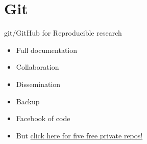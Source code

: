 \documentclass{beamer}
\begin{document}
\section{Git}
\begin{frame}{git/GitHub for Reproducible research}
\begin{itemize}
	\item<2->{Full documentation}
	\vspace{2ex}
	\item<3->{Collaboration}
	\vspace{2ex}
	\item<4->{Dissemination}
	\vspace{2ex}
	\item<5->{Backup}
	\vspace{2ex}
	\item<6->{Facebook of code}
	\vspace{2ex}
	\item<7->{But \href{https://education.github.com/discount_requests/new}{click here for five free private repos!}}

\end{itemize}
\end{frame}
\end{document}
